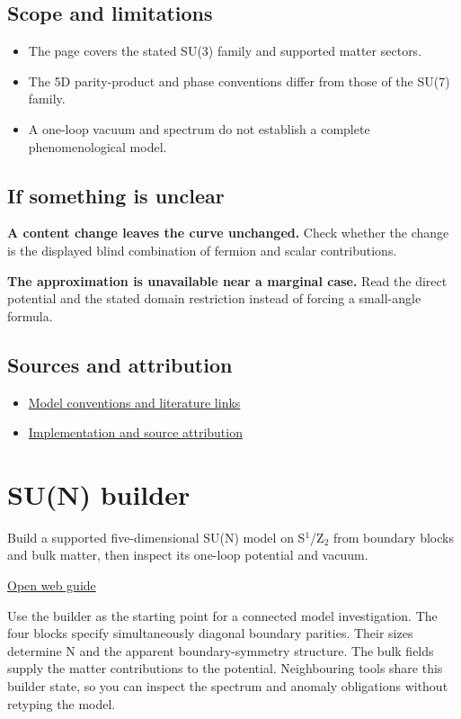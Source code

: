 \documentclass[11pt,a4paper]{article}
\begin{document}
\subsection*{Scope and limitations}
\begin{itemize}
\item The page covers the stated SU(3) family and supported matter sectors.
\item The 5D parity-product and phase conventions differ from those of the SU(7) family.
\item A one-loop vacuum and spectrum do not establish a complete phenomenological model.
\end{itemize}
\subsection*{If something is unclear}
\textbf{A content change leaves the curve unchanged.} Check whether the change is the displayed blind combination of fermion and scalar contributions.

\textbf{The approximation is unavailable near a marginal case.} Read the direct potential and the stated domain restriction instead of forcing a small-angle formula.

\subsection*{Sources and attribution}
\begin{itemize}
\item \href{https://karlesmarin.github.io/ghu-explorer/docs/index.html}{Model conventions and literature links}
\item \href{https://github.com/karlesmarin/ghu-lab/blob/main/src/sections/fived_section.js}{Implementation and source attribution}
\end{itemize}
\section{SU(N) builder}
Build a supported five-dimensional SU(N) model on S\ensuremath{{}^{1}}/Z\ensuremath{{}_{2}} from boundary blocks and bulk matter, then inspect its one-loop potential and vacuum.

\href{https://karlesmarin.github.io/ghu-explorer/guide/sun5d/index.html}{Open web guide}

Use the builder as the starting point for a connected model investigation. The four blocks specify simultaneously diagonal boundary parities. Their sizes determine N and the apparent boundary-symmetry structure. The bulk fields supply the matter contributions to the potential. Neighbouring tools share this builder state, so you can inspect the spectrum and anomaly obligations without retyping the model.
\end{document}
